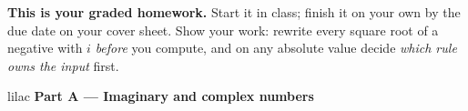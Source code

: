 \documentclass[10pt]{article}
\begin{document}

\vspace{0.12in}

\boxguard[8]
\begin{remindbox}
\small
\textbf{This is your graded homework.} Start it in class; finish it on your own by the due
date on your cover sheet. Show your work: rewrite every square root of a negative with $i$
\emph{before} you compute, and on any absolute value decide \emph{which rule owns the input}
first.
\end{remindbox}

\vspace{0.12in}

\begin{headlinebox}{lilac}
\textbf{\color{plum}Part A --- Imaginary and complex numbers}
\end{headlinebox}
\end{document}
